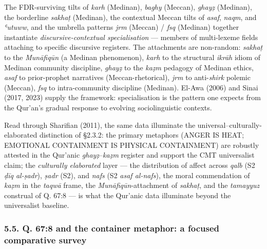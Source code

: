 \documentclass[11pt,a4paper]{article}
\begin{document}
The FDR-surviving tilts of \emph{karh} (Medinan), \emph{baghy} (Meccan),
\emph{ghayẓ} (Medinan), the borderline \emph{sakhaṭ} (Medinan), the
contextual Meccan tilts of \emph{asaf}, \emph{naqm}, and \emph{ʿutuww},
and the umbrella patterns \emph{jrm} (Meccan) / \emph{fsq} (Medinan)
together instantiate \emph{discursive-contextual specialisation} ---
members of multi-lexeme fields attaching to specific discursive
registers. The attachments are non-random: \emph{sakhaṭ} to the
\emph{Munāfiqūn} (a Medinan phenomenon), \emph{karh} to the structural
\emph{ikrāh} idiom of Medinan community discipline, \emph{ghayẓ} to the
\emph{kaẓm} pedagogy of Medinan ethics, \emph{asaf} to prior-prophet
narratives (Meccan-rhetorical), \emph{jrm} to anti-\emph{shirk} polemic
(Meccan), \emph{fsq} to intra-community discipline (Medinan). El-Awa
(2006) and Sinai (2017, 2023) supply the framework: specialisation is
the pattern one expects from the Qur'an's gradual response to evolving
sociolinguistic contexts.

Read through Sharifian (2011), the same data illuminate the
universal--culturally-elaborated distinction of §2.3.2: the primary
metaphors (ANGER IS HEAT; EMOTIONAL CONTAINMENT IS PHYSICAL CONTAINMENT)
are robustly attested in the Qur'anic \emph{ghayẓ}--\emph{kaẓm} register
and support the CMT universalist claim; the \emph{culturally elaborated}
layer --- the distribution of affect across \emph{qalb} (S2 \emph{ḍīq
al-ṣadr}), \emph{ṣadr} (S2), and \emph{nafs} (S2 \emph{asaf al-nafs}),
the moral commendation of \emph{kaẓm} in the \emph{taqwā} frame, the
\emph{Munāfiqūn}-attachment of \emph{sakhaṭ}, and the \emph{tamayyuz}
construal of Q. 67:8 --- is what the Qur'anic data illuminate beyond the
universalist baseline.

\subsubsection{5.5. Q. 67:8 and the container metaphor: a focused
comparative
survey}\label{q.-678-and-the-container-metaphor-a-focused-comparative-survey}
\end{document}
